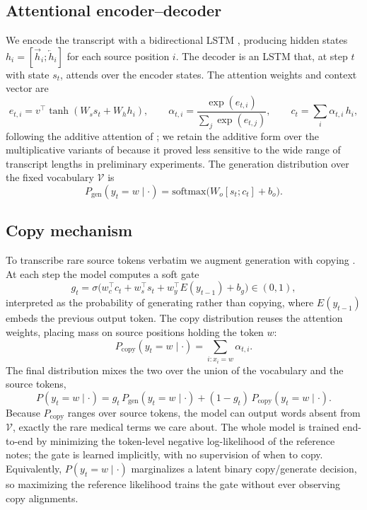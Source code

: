 \documentclass{article}
\begin{document}
\subsection{Attentional encoder--decoder}

We encode the transcript with a bidirectional LSTM \citep{Hochreiter1997,Graves2005},
producing hidden states $h_i = [\overrightarrow{h}_i; \overleftarrow{h}_i]$ for each
source position $i$. The decoder is an LSTM that, at step $t$ with state $s_t$,
attends over the encoder states. The attention weights and context vector are
\begin{equation}
e_{t,i} = v^\top \tanh(W_s s_t + W_h h_i), \qquad
\alpha_{t,i} = \frac{\exp(e_{t,i})}{\sum_{j} \exp(e_{t,j})}, \qquad
c_t = \sum_i \alpha_{t,i}\, h_i ,
\end{equation}
following the additive attention of \citet{Bahdanau2015}; we retain the additive form
over the multiplicative variants of \citet{Luong2015att} because it proved less
sensitive to the wide range of transcript lengths in preliminary experiments. The
generation distribution over the fixed vocabulary $\mathcal{V}$ is
\begin{equation}
P_{\text{gen}}(y_t = w \mid \cdot) = \mathrm{softmax}\big(W_o [s_t; c_t] + b_o\big).
\end{equation}

\subsection{Copy mechanism}

To transcribe rare source tokens verbatim we augment generation with copying
\citep{Gu2016,Gulcehre2016}. At each step the model computes a soft gate
\begin{equation}
g_t = \sigma\big(w_c^\top c_t + w_s^\top s_t + w_y^\top E(y_{t-1}) + b_g\big) \in (0,1),
\end{equation}
interpreted as the probability of generating rather than copying, where $E(y_{t-1})$
embeds the previous output token. The copy distribution reuses the attention weights,
placing mass on source positions holding the token $w$:
\begin{equation}
P_{\text{copy}}(y_t = w \mid \cdot) = \sum_{i : x_i = w} \alpha_{t,i}.
\end{equation}
The final distribution mixes the two over the union of the vocabulary and the source
tokens,
\begin{equation}
P(y_t = w \mid \cdot) = g_t\, P_{\text{gen}}(y_t = w \mid \cdot) + (1 - g_t)\, P_{\text{copy}}(y_t = w \mid \cdot).
\end{equation}
Because $P_{\text{copy}}$ ranges over source tokens, the model can output words
absent from $\mathcal{V}$, exactly the rare medical terms we care about. The whole
model is trained end-to-end by minimizing the token-level negative log-likelihood of
the reference notes; the gate is learned implicitly, with no supervision of when to
copy. Equivalently, $P(y_t = w \mid \cdot)$ marginalizes a latent binary copy/generate
decision, so maximizing the reference likelihood trains the gate without ever
observing copy alignments.
\end{document}
